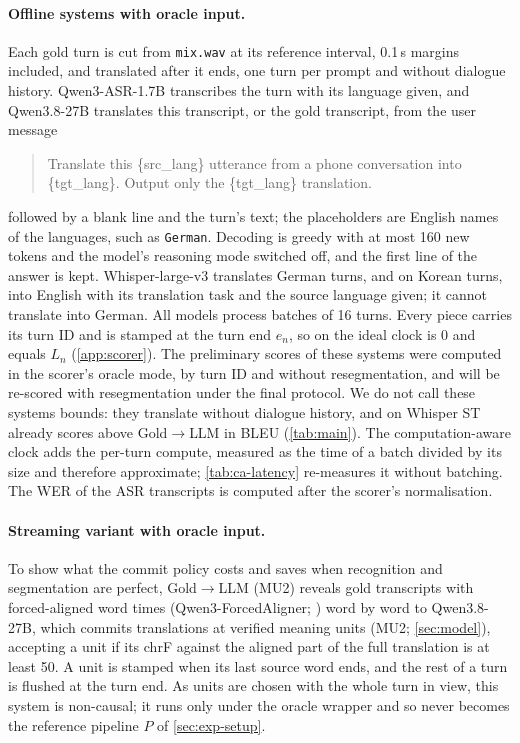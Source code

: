 \paragraph{Offline systems with oracle input.}
Each gold turn is cut from \texttt{mix.wav} at its reference interval, 0.1\,s margins included, and translated after it ends, one turn per prompt and without dialogue history. Qwen3-ASR-1.7B \citep{shi2026qwen3asr} transcribes the turn with its language given, and Qwen3.8-27B translates this transcript, or the gold transcript, from the user message
\begin{quote}\small\ttfamily\raggedright
Translate this \{src\_lang\} utterance from a phone conversation into \{tgt\_lang\}. Output only the \{tgt\_lang\} translation.
\end{quote}
followed by a blank line and the turn's text; the placeholders are English names of the languages, such as \texttt{German}. Decoding is greedy with at most 160 new tokens and the model's reasoning mode switched off, and the first line of the answer is kept. Whisper-large-v3 \citep{radford2023robust} translates German turns, and on \syn Korean turns, into English with its translation task and the source language given; it cannot translate into German. All models process batches of 16 turns. Every piece carries its turn ID and is stamped at the turn end $e_n$, so on the ideal clock \eo is 0 and \laal equals $L_n$ (\cref{app:scorer}). The preliminary \taxi scores of these systems were computed in the scorer's oracle mode, by turn ID and without resegmentation, and will be re-scored with resegmentation under the final protocol. We do not call these systems bounds: they translate without dialogue history, and on \deen Whisper ST already scores above Gold$\to$LLM in BLEU (\cref{tab:main}). The computation-aware clock adds the per-turn compute, measured as the time of a batch divided by its size and therefore approximate; \cref{tab:ca-latency} re-measures it without batching. The WER of the ASR transcripts is computed after the scorer's normalisation.

\paragraph{Streaming variant with oracle input.}
To show what the commit policy costs and saves when recognition and segmentation are perfect, Gold$\to$LLM (MU2) reveals gold transcripts with forced-aligned word times (Qwen3-ForcedAligner; \citealp{shi2026qwen3asr}) word by word to Qwen3.8-27B, which commits translations at verified meaning units (MU2; \cref{sec:model}), accepting a unit if its chrF against the aligned part of the full translation is at least 50. A unit is stamped when its last source word ends, and the rest of a turn is flushed at the turn end. As units are chosen with the whole turn in view, this system is non-causal; it runs only under the oracle wrapper and so never becomes the reference pipeline $P$ of \cref{sec:exp-setup}.

